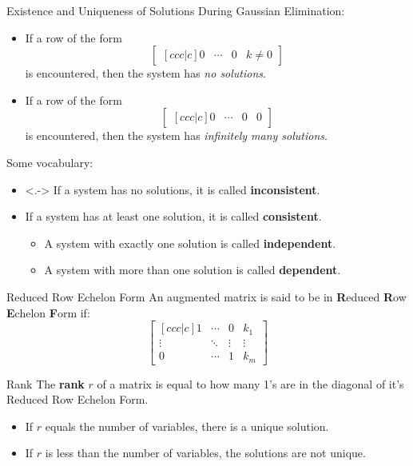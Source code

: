 \documentclass{beamer}
\begin{document}
\begin{frame}
\begin{block}{Existence and Uniqueness of Solutions}
During Gaussian Elimination:
\begin{itemize}
\item<+->If a row of the form
\begin{equation*}
\begin{bmatrix}[ccc|c]
0 & \cdots & 0 & k\neq 0
\end{bmatrix}
\end{equation*}
is encountered, then the system has \emph{no solutions}.
\item<+->
If a row of the form
\begin{equation*}
\begin{bmatrix}[ccc|c]
0 & \cdots & 0 & 0
\end{bmatrix}
\end{equation*}
is encountered, then the system has \emph{infinitely many solutions}.
\end{itemize}
\onslide<+->
Some vocabulary:
\begin{itemize}
\item<.-> If a system has no solutions, it is called \textbf{inconsistent}.
\item<+-> If a system has at least one solution, it is called \textbf{consistent}.
\begin{itemize}
\item<+-> A system with exactly one solution is called \textbf{independent}.
\item<+-> A system with more than one solution is called \textbf{dependent}.
\end{itemize}
\end{itemize}
\end{block}
\end{frame}

\begin{frame}
\begin{block}{Reduced Row Echelon Form}
An augmented matrix is said to be in \textbf{R}educed \textbf{R}ow \textbf{E}chelon \textbf{F}orm if:
\begin{equation*}
\begin{bmatrix}[ccc|c]
1&\cdots&0&k_1\\
\vdots&\ddots&\vdots&\vdots\\
0&\cdots&1&k_m
\end{bmatrix}
\end{equation*}
\end{block}\pause
\begin{block}{Rank}
The \textbf{rank} $r$ of a matrix is equal to how many 1's are in the diagonal of it's Reduced Row Echelon Form.
\begin{itemize}
\item If $r$ equals the number of variables, there is a unique solution.
\item If $r$ is less than the number of variables, the solutions are not unique.
\end{itemize}
\end{block}
\end{frame}
\end{document}
